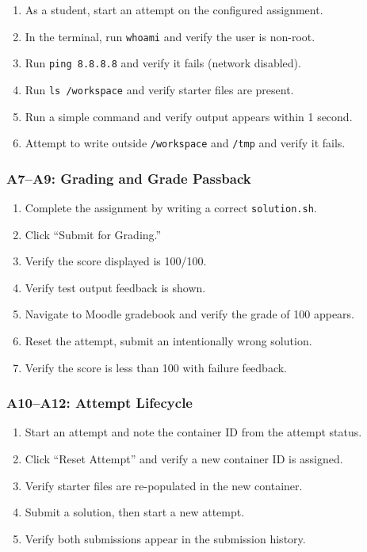 \documentclass[12pt, letterpaper]{article}
\begin{document}
\begin{enumerate}
    \item As a student, start an attempt on the configured assignment.
    \item In the terminal, run \texttt{whoami} and verify the user is non-root.
    \item Run \texttt{ping 8.8.8.8} and verify it fails (network disabled).
    \item Run \texttt{ls /workspace} and verify starter files are present.
    \item Run a simple command and verify output appears within 1 second.
    \item Attempt to write outside \texttt{/workspace} and \texttt{/tmp} and verify it fails.
\end{enumerate}

\subsubsection{A7--A9: Grading and Grade Passback}

\begin{enumerate}
    \item Complete the assignment by writing a correct \texttt{solution.sh}.
    \item Click ``Submit for Grading.''
    \item Verify the score displayed is 100/100.
    \item Verify test output feedback is shown.
    \item Navigate to Moodle gradebook and verify the grade of 100 appears.
    \item Reset the attempt, submit an intentionally wrong solution.
    \item Verify the score is less than 100 with failure feedback.
\end{enumerate}

\subsubsection{A10--A12: Attempt Lifecycle}

\begin{enumerate}
    \item Start an attempt and note the container ID from the attempt status.
    \item Click ``Reset Attempt'' and verify a new container ID is assigned.
    \item Verify starter files are re-populated in the new container.
    \item Submit a solution, then start a new attempt.
    \item Verify both submissions appear in the submission history.
\end{enumerate}
\end{document}
